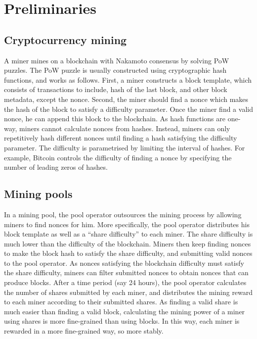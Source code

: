 \section{Preliminaries}

\subsection{Cryptocurrency mining}


A miner mines on a blockchain with Nakamoto consensus by solving PoW puzzles.
The PoW puzzle is usually constructed using cryptographic hash functions, and works as follows.
First, a miner constructs a block template, which consists of transactions to include, hash of the last block, and other block metadata, except the nonce.
Second, the miner should find a nonce which makes the hash of the block to satisfy a difficulty parameter.
Once the miner find a valid nonce, he can append this block to the blockchain.
As hash functions are one-way, miners cannot calculate nonces from hashes.
Instead, miners can only repetitively hash different nonces until finding a hash satisfying the difficulty parameter.
The difficulty is parametrised by limiting the interval of hashes.
For example, Bitcoin controls the difficulty of finding a nonce by specifying the number of leading zeros of hashes.





\subsection{Mining pools}

In a mining pool, the pool operator outsources the mining process by allowing miners to find nonces for him.
More specifically, the pool operator distributes his block template as well as a ``share difficulty'' to each miner.
The share difficulty is much lower than the difficulty of the blockchain.
Miners then keep finding nonces to make the block hash to satisfy the share difficulty, and submitting valid nonces to the pool operator.
As nonces satisfying the blockchain difficulty must satisfy the share difficulty, miners can filter  submitted nonces to obtain nonces that can produce blocks.
After a time period (say 24 hours), the pool operator calculates the number of shares submitted by each miner, and distributes the mining reward to each miner according to their submitted shares.
As finding a valid share is much easier than finding a valid block, calculating the mining power of a miner using shares is more fine-grained than using blocks.
In this way, each miner is rewarded in a more fine-grained way, so more stably.




